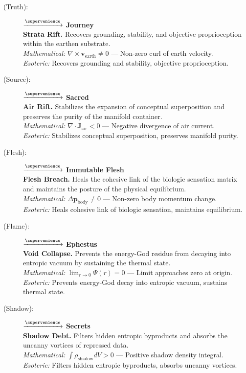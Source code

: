 \begin{description}
    \item[(Truth):] \velirn $\xrightarrow{\supervenience}$ \textbf{Journey} \\
    \textbf{Strata Rift.} Recovers grounding, stability, and objective proprioception within the earthen substrate. \\
    \textit{Mathematical:} $\nabla \times \mathbf{v}_{\text{earth}} \neq 0$ — Non-zero curl of earth velocity. \\
    \textit{Esoteric:} Recovers grounding and stability, objective proprioception.

    \item[(Source):] \soryon $\xrightarrow{\supervenience}$ \textbf{Sacred} \\
    \textbf{Air Rift.} Stabilizes the expansion of conceptual superposition and preserves the purity of the manifold container. \\
    \textit{Mathematical:} $\nabla \cdot \mathbf{J}_{\text{air}} < 0$ — Negative divergence of air current. \\
    \textit{Esoteric:} Stabilizes conceptual superposition, preserves manifold purity.

    \item[(Flesh):] \kothrhun $\xrightarrow{\supervenience}$ \textbf{Immutable Flesh} \\
    \textbf{Flesh Breach.} Heals the cohesive link of the biologic sensation matrix and maintains the posture of the physical equilibrium. \\
    \textit{Mathematical:} $\Delta \mathbf{p}_{\text{body}} \neq 0$ — Non-zero body momentum change. \\
    \textit{Esoteric:} Heals cohesive link of biologic sensation, maintains equilibrium.

    \item[(Flame):] \drehizh $\xrightarrow{\supervenience}$ \textbf{Ephestus} \\
    \textbf{Void Collapse.} Prevents the energy-God residue from decaying into entropic vacuum by sustaining the thermal state. \\
    \textit{Mathematical:} $\lim_{r\to 0} \Psi(r) = 0$ — Limit approaches zero at origin. \\
    \textit{Esoteric:} Prevents energy-God decay into entropic vacuum, sustains thermal state.

    \item[(Shadow):] \rheafral $\xrightarrow{\supervenience}$ \textbf{Secrets} \\
    \textbf{Shadow Debt.} Filters hidden entropic byproducts and absorbs the uncanny vortices of repressed data. \\
    \textit{Mathematical:} $\int \rho_{\text{shadow}} dV > 0$ — Positive shadow density integral. \\
    \textit{Esoteric:} Filters hidden entropic byproducts, absorbs uncanny vortices.


\end{description}
